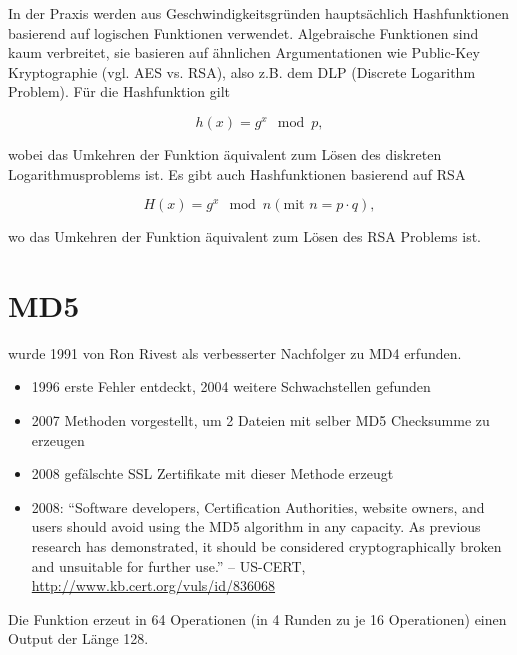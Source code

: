 In der Praxis werden aus Geschwindigkeitsgründen hauptsächlich Hashfunktionen
basierend auf logischen Funktionen verwendet. Algebraische Funktionen sind kaum verbreitet, sie basieren auf ähnlichen Argumentationen wie
Public-Key Kryptographie (vgl. AES vs. RSA), also z.B. dem DLP (Discrete Logarithm Problem). Für die Hashfunktion gilt 

$$h(x) = g^x \mod p,$$

wobei das Umkehren der Funktion äquivalent zum Lösen des diskreten Logarithmusproblems ist.
Es gibt auch Hashfunktionen basierend auf RSA

$$H(x) = g^x \mod n (\text{mit } n = p\cdot q),$$

wo das Umkehren der Funktion äquivalent zum Lösen des RSA Problems ist.

\section{MD5} wurde 1991 von Ron Rivest als verbesserter Nachfolger zu MD4 erfunden.

\begin{itemize}
    \item 1996 erste Fehler entdeckt, 2004 weitere Schwachstellen gefunden
    \item 2007 Methoden vorgestellt, um 2 Dateien mit selber MD5 Checksumme zu erzeugen
    \item 2008 gefälschte SSL Zertifikate mit dieser Methode erzeugt
    \item 2008: ``Software developers, Certification Authorities, website owners, and users should avoid using the MD5 algorithm in any capacity. As previous research 
    has demonstrated, it should be considered cryptographically broken and unsuitable for further use.'' -- US-CERT, \url{http://www.kb.cert.org/vuls/id/836068}
\end{itemize}

Die Funktion erzeut in 64 Operationen (in 4 Runden zu je 16 Operationen) einen Output der Länge 128.

